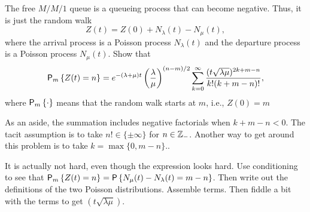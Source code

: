\begin{exercise}  The
  free $M/M/1$ queue is a queueing process that can become
  negative. Thus, it is just the random walk
\begin{equation*}
  Z(t) = Z(0) + N_\lambda(t) - N_\mu(t), 
\end{equation*}
where the arrival process is a Poisson process $N_\lambda(t)$ and the
departure process is a Poisson process $N_\mu(t)$. Show that
\begin{equation*}
    \P{Z(t)=n}_m 
= e^{-(\lambda+\mu)t} \left(\frac\lambda\mu\right)^{(n-m)/2} \sum_{k=0}^\infty 
\frac{(t\sqrt{\lambda\mu} )^{2k+m-n}}{k!(k+m-n)!},
\end{equation*}
where $\P{\cdot}_m$ means that the random walk starts at $m$, i.e.,
$Z(0)=m$ 

As an aside, the summation includes negative factorials when
$k+m-n<0$. The tacit assumption is to take $n!\in \{\pm \infty\}$ for
$n\in \mathbb{Z}_-$. Another way to get around this problem is to take
$k=\max\{0, m-n\}$..
\begin{hint}
It is actually not hard, even though the expression looks
  hard. Use conditioning to see that
  $\P{Z(t)=n}_m = \P{N_\mu(t) - N_\lambda(t) = m - n}$. Then write out
  the definitions of the two Poisson distributions. Assemble
  terms. Then fiddle a bit with the terms to get
  $(t\sqrt{\lambda\mu})$. 
\end{hint}



\end{exercise}

